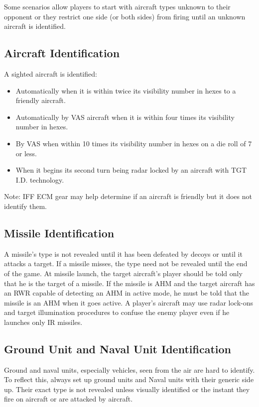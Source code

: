 \begin{advancedrules}
    Some scenarios allow players to start with aircraft types unknown to their opponent or they restrict one side (or both sides) from firing until an unknown aircraft is identified.

    \subsection{Aircraft Identification} A sighted aircraft is identified:

    \begin{itemize}

        \item Automatically when it is within twice its visibility number in hexes to a friendly aircraft.

        \item Automatically by VAS aircraft when it is within four times its visibility number in hexes.

        \item By VAS when within 10 times its visibility number in hexes on a die roll of 7 or less.

        \item When it begins its second turn being radar locked by an aircraft with TGT I.D. technology.

    \end{itemize}

    Note: IFF ECM gear may help determine if an aircraft is friendly but it does not identify them.

    \subsection{Missile Identification} A missile's type is not revealed until it has been defeated by decoys or until it attacks a target. If a missile misses, the type need not be revealed until the end of the game. At missile launch, the target aircraft's player should be told only that he is the target of a missile. If the missile is AHM and the target aircraft has an RWR capable of detecting an AHM in active mode, he must be told that the missile is an AHM when it goes active. A player's aircraft may use radar lock-ons and target illumination procedures to confuse the enemy player even if he launches only IR missiles.

    \subsection{Ground Unit and Naval Unit Identification} Ground and naval units, especially vehicles, seen from the air are hard to identify. To reflect this, always set up ground units and Naval units with their generic side up. Their exact type is not revealed unless visually identified or the instant they fire on aircraft or are attacked by aircraft.


\end{advancedrules}
